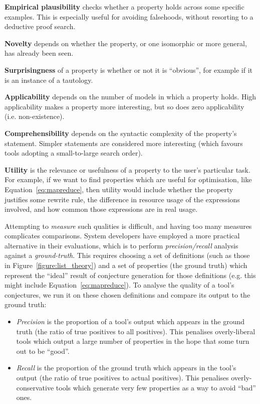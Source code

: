{\bf Empirical plausibility} checks whether a property holds across some
specific examples. This is especially useful for avoiding falsehoods, without
resorting to a deductive proof search.

{\bf Novelty} depends on whether the property, or one isomorphic or more
general, has already been seen.

{\bf Surprisingness} of a property is whether or not it is ``obvious'', for
example if it is an instance of a tautology.

{\bf Applicability} depends on the number of models in which a
property holds. High applicability makes a property more interesting, but so
does zero applicability (i.e. non-existence).

{\bf Comprehensibility} depends on the syntactic complexity of the property's
statement. Simpler statements are considered more interesting (which favours
tools adopting a small-to-large search order).

{\bf Utility} is the relevance or usefulness of a property to the user's
particular task. For example, if we want to find properties which are useful for
optimisation, like Equation~\ref{eq:mapreduce}, then utility would include
whether the property justifies some rewrite rule, the difference in resource
usage of the expressions involved, and how common those expressions are in real
usage.

Attempting to \emph{measure} such qualities is difficult, and having too many
measures complicates comparisons. System developers have employed a more
practical alternative in their evaluations, which is to perform
\emph{precision/recall} analysis against a \emph{ground-truth}. This requires
choosing a set of definitions (such as those in Figure~\ref{figure:list_theory})
and a set of properties (the ground truth) which represent the ``ideal'' result
of conjecture generation for those definitions (e.g. this might include
Equation~\ref{eq:mapreduce}). To analyse the quality of a tool's conjectures, we
run it on these chosen definitions and compare its output to the ground truth:

\begin{itemize}
\item \emph{Precision} is the proportion of a tool's output which appears in
  the ground truth (the ratio of true positives to all positives). This
  penalises overly-liberal tools which output a large number of properties in
  the hope that some turn out to be ``good''.
\item \emph{Recall} is the proportion of the ground truth which appears in the
  tool's output (the ratio of true positives to actual positives). This
  penalises overly-conservative tools which generate very few properties as a
  way to avoid ``bad'' ones.
\end{itemize}

